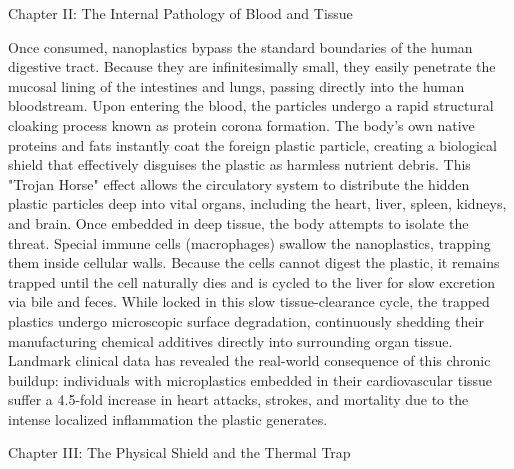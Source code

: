 Chapter II: The Internal Pathology of Blood and Tissue

Once consumed, nanoplastics bypass the standard boundaries of the human digestive tract. Because they are infinitesimally small, they easily penetrate the mucosal lining of the intestines and lungs, passing directly into the human bloodstream. Upon entering the blood, the particles undergo a rapid structural cloaking process known as protein corona formation. The body's own native proteins and fats instantly coat the foreign plastic particle, creating a biological shield that effectively disguises the plastic as harmless nutrient debris.
This "Trojan Horse" effect allows the circulatory system to distribute the hidden plastic particles deep into vital organs, including the heart, liver, spleen, kidneys, and brain. Once embedded in deep tissue, the body attempts to isolate the threat. Special immune cells (macrophages) swallow the nanoplastics, trapping them inside cellular walls. Because the cells cannot digest the plastic, it remains trapped until the cell naturally dies and is cycled to the liver for slow excretion via bile and feces.
While locked in this slow tissue-clearance cycle, the trapped plastics undergo microscopic surface degradation, continuously shedding their manufacturing chemical additives directly into surrounding organ tissue. Landmark clinical data has revealed the real-world consequence of this chronic buildup: individuals with microplastics embedded in their cardiovascular tissue suffer a 4.5-fold increase in heart attacks, strokes, and mortality due to the intense localized inflammation the plastic generates.

Chapter III: The Physical Shield and the Thermal Trap


